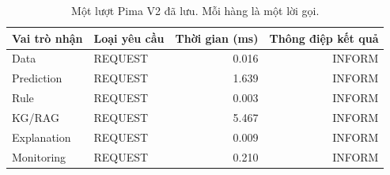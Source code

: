 \par\FloatBarrier\begin{table}[H]\centering\small{}\setlength{\tabcolsep}{5pt}
\caption{Một lượt Pima V2 đã lưu. Mỗi hàng là một lời gọi.}\begin{tabular}{llrr}\toprule
Vai trò nhận & Loại yêu cầu & Thời gian (ms) & Thông điệp kết quả\\\midrule
Data & REQUEST & 0.016 & INFORM\\
Prediction & REQUEST & 1.639 & INFORM\\
Rule & REQUEST & 0.003 & INFORM\\
KG/RAG & REQUEST & 5.467 & INFORM\\
Explanation & REQUEST & 0.009 & INFORM\\
Monitoring & REQUEST & 0.210 & INFORM\\\bottomrule\end{tabular}\end{table}
